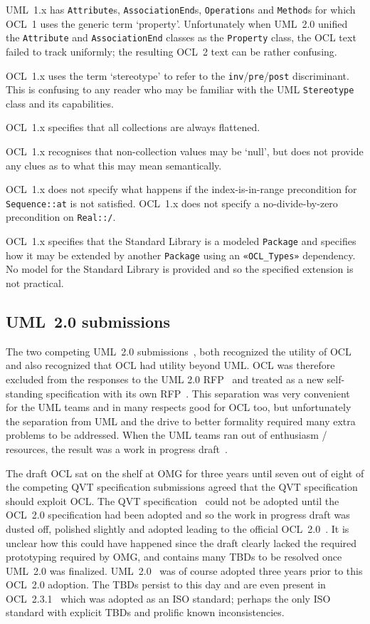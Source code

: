 \documentclass{jot}
\begin{document}
UML~1.x has \verb$Attribute$s, \verb$AssociationEnd$s, \verb$Operation$s and \verb$Method$s for which OCL~1 uses the generic term `property'. Unfortunately when UML~2.0 unified the \verb$Attribute$ and \verb$AssociationEnd$ classes as the \verb$Property$ class, the OCL text failed to track uniformly; the resulting OCL~2 text can be rather confusing.

OCL~1.x uses the term `stereotype' to refer to the \verb$inv$/\verb$pre$/\verb$post$ discriminant. This is confusing to any reader who may be familiar with the UML \verb$Stereotype$ class and its capabilities.

OCL~1.x specifies that all collections are always flattened.

OCL~1.x recognises that non-collection values may be `null', but does not provide any clues as to what this may mean semantically.

OCL~1.x does not specify what happens if the index-is-in-range precondition for \verb$Sequence::at$ is not satisfied. OCL~1.x does not specify a no-divide-by-zero precondition on \verb$Real::/$.

OCL~1.x specifies that the Standard Library is a modeled \verb$Package$ and specifies how it may be extended by another \verb$Package$ using an \verb$«OCL_Types»$ dependency. No model for the Standard Library is provided and so the specified extension is not practical. 

\subsection{UML~2.0 submissions}

The two competing UML~2.0 submissions~\cite{UML-2U},\cite{UML-U2P} both recognized the utility of OCL and also recognized that OCL had utility beyond UML. OCL was therefore excluded from the responses to the UML 2.0 RFP~\cite{UML-2.0-RFP} and treated as a new self-standing specification with its own RFP~\cite{OCL-2.0-RFP}. This separation was very convenient for the UML teams and in many respects good for OCL too, but unfortunately the separation from UML and the drive to better formality required many extra problems to be addressed. When the UML teams ran out of enthusiasm / resources, the result was a work in progress draft~\cite{OCL-2.0-draft}.

The draft OCL sat on the shelf at OMG for three years until seven out of eight of the competing QVT specification submissions agreed that the QVT specification should exploit OCL. The QVT specification~\cite{QVT-1.0} could not be adopted until the OCL~2.0 specification had been adopted and so the work in progress draft was dusted off, polished slightly and adopted leading to the official OCL~2.0~\cite{OCL-2.0}. It is unclear how this could have happened since the draft clearly lacked the required prototyping required by OMG, and contains many TBDs to be resolved once UML~2.0 was finalized. UML~2.0~\cite{UML-2.0-adopted} was of course adopted three years prior to this OCL~2.0 adoption. The TBDs persist to this day and are even present in OCL~2.3.1~\cite{OCL-2.3.1} which was adopted as an ISO standard; perhaps the only ISO standard with explicit TBDs and prolific known inconsistencies.
\end{document}
